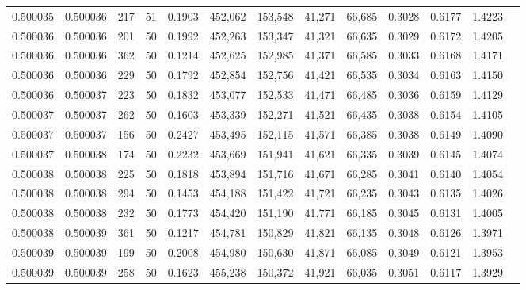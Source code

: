 \begin{tabular}{rrrrrrrrrrrrr}
0.500035 & 0.500036 &   217 &  51 &                                     0.1903 & 452,062 & 153,548 &  41,271 &  66,685 & 0.3028 & 0.6177 & 1.4223 \\
0.500036 & 0.500036 &   201 &  50 &                                     0.1992 & 452,263 & 153,347 &  41,321 &  66,635 & 0.3029 & 0.6172 & 1.4205 \\
0.500036 & 0.500036 &   362 &  50 &                                     0.1214 & 452,625 & 152,985 &  41,371 &  66,585 & 0.3033 & 0.6168 & 1.4171 \\
0.500036 & 0.500036 &   229 &  50 &                                     0.1792 & 452,854 & 152,756 &  41,421 &  66,535 & 0.3034 & 0.6163 & 1.4150 \\
0.500036 & 0.500037 &   223 &  50 &                                     0.1832 & 453,077 & 152,533 &  41,471 &  66,485 & 0.3036 & 0.6159 & 1.4129 \\
0.500037 & 0.500037 &   262 &  50 &                                     0.1603 & 453,339 & 152,271 &  41,521 &  66,435 & 0.3038 & 0.6154 & 1.4105 \\
0.500037 & 0.500037 &   156 &  50 &                                     0.2427 & 453,495 & 152,115 &  41,571 &  66,385 & 0.3038 & 0.6149 & 1.4090 \\
0.500037 & 0.500038 &   174 &  50 &                                     0.2232 & 453,669 & 151,941 &  41,621 &  66,335 & 0.3039 & 0.6145 & 1.4074 \\
0.500038 & 0.500038 &   225 &  50 &                                     0.1818 & 453,894 & 151,716 &  41,671 &  66,285 & 0.3041 & 0.6140 & 1.4054 \\
0.500038 & 0.500038 &   294 &  50 &                                     0.1453 & 454,188 & 151,422 &  41,721 &  66,235 & 0.3043 & 0.6135 & 1.4026 \\
0.500038 & 0.500038 &   232 &  50 &                                     0.1773 & 454,420 & 151,190 &  41,771 &  66,185 & 0.3045 & 0.6131 & 1.4005 \\
0.500038 & 0.500039 &   361 &  50 &                                     0.1217 & 454,781 & 150,829 &  41,821 &  66,135 & 0.3048 & 0.6126 & 1.3971 \\
0.500039 & 0.500039 &   199 &  50 &                                     0.2008 & 454,980 & 150,630 &  41,871 &  66,085 & 0.3049 & 0.6121 & 1.3953 \\
0.500039 & 0.500039 &   258 &  50 &                                     0.1623 & 455,238 & 150,372 &  41,921 &  66,035 & 0.3051 & 0.6117 & 1.3929 \\

\end{tabular}
